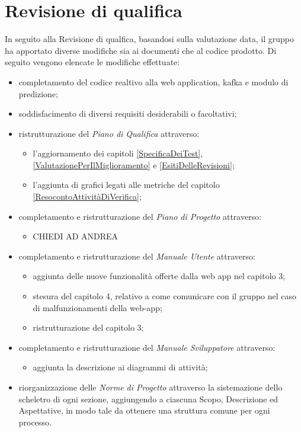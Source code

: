 \section{Revisione di qualifica}\label{EsitiDelleRevisioniRevisioneDiQualifica}
In seguito alla Revisione di qualfica, basandosi sulla valutazione data, il gruppo ha apportato diverse modifiche sia ai documenti che al codice prodotto. Di seguito vengono elencate le modifiche effettuate:
\begin{itemize}
		\item completamento del codice realtivo alla web application, kafka e modulo di predizione;
		\item soddisfacimento di diversi requisiti desiderabili o facoltativi;
		\item ristrutturazione del \textit{Piano di Qualifica} attraverso:
	\begin{itemize}
		\item l'aggiornamento dei capitoli \ref{SpecificaDeiTest}, \ref{ValutazionePerIlMiglioramento} e \ref{EsitiDelleRevisioni};
		\item l'aggiunta di grafici legati alle metriche del capitolo \ref{ResocontoAttivitàDiVerifica};
	\end{itemize}
	\item completamento e ristrutturazione  del \textit{Piano di Progetto} attraverso:
	\begin{itemize}
		\item CHIEDI AD ANDREA
	\end{itemize}
	\item completamento e ristrutturazione  del \textit{Manuale Utente} attraverso: 
	\begin{itemize}
		\item aggiunta delle nuove funzionalità offerte dalla web app nel capitolo 3;
		\item stesura del capitolo 4, relativo a come comunicare con il gruppo nel caso di malfunzionamenti della web-app;
		\item ristrutturazione del capitolo 3;
	\end{itemize}
\item completamento e ristrutturazione  del \textit{Manuale Sviluppatore} attraverso: 
\begin{itemize}
	\item aggiunta la descrizione ai diagrammi di attività; 
\end{itemize}
\item riorganizzazione delle \textit{Norme di Progetto} attraverso la sistemazione dello scheletro di ogni sezione, aggiungendo a ciascuna Scopo, Descrizione ed Aspettative, in modo tale da ottenere una struttura comune per ogni processo.

\end{itemize}